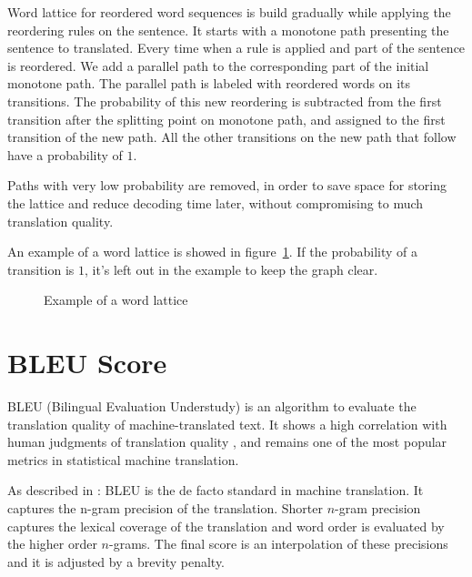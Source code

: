 Word lattice for reordered word sequences is build gradually while applying the reordering rules on the sentence. It starts with a monotone path presenting the sentence to translated. Every time when a rule is applied and part of the sentence is reordered. We add a parallel path to the corresponding part of the initial monotone path. The parallel path is labeled with reordered words on its transitions. The probability of this new reordering is subtracted from the first transition after the splitting point on monotone path, and assigned to the first transition of the new path. All the other transitions on the new path that follow have a probability of $1$.


Paths with very low probability are removed, in order to save space for storing the lattice and reduce decoding time later, without compromising to much translation quality. %

An example of a word lattice is showed in figure~\ref{Lattices}. If the probability of a transition is $1$, it's left out in the example to keep the graph clear.


\begin{landscape}
\begin{figure}
\centering

\caption{Example of a word lattice}
\label{Lattices}
\end{figure}
\end{landscape}

\section{BLEU Score}
\label{ch:Foundations:sec:bleu}

BLEU (Bilingual Evaluation Understudy) is an algorithm to evaluate the translation quality of machine-translated text. It shows a high correlation with human judgments of translation quality \citep{bleuscore}, and remains one of the most popular metrics in statistical machine translation.

As described in \cite{metrics}: BLEU is the de facto standard in machine translation. It captures the n-gram precision of the translation. Shorter $n$-gram precision captures the lexical coverage of the translation and word order is evaluated by the higher order $n$-grams. The final score is an interpolation of these precisions and it is adjusted by a brevity penalty.

